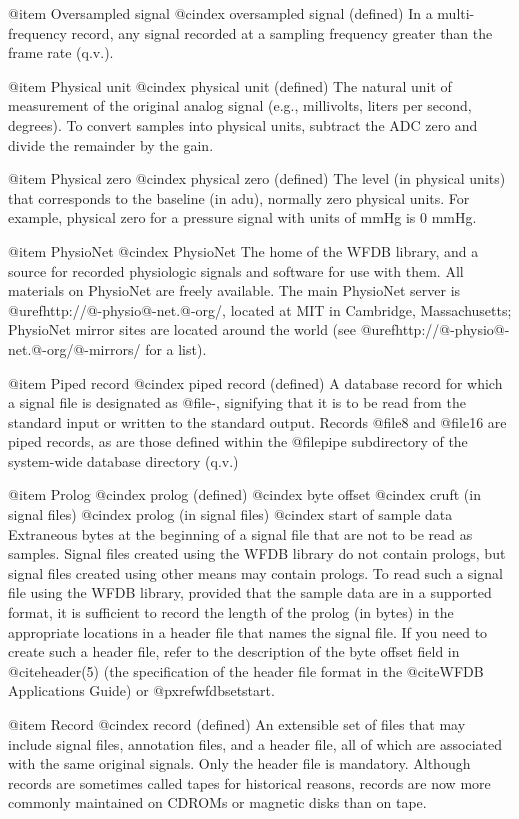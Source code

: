 {{{{{{{{@item Oversampled signal
@cindex oversampled signal (defined)
In a multi-frequency record, any signal recorded at a sampling frequency
greater than the frame rate (q.v.).

@item Physical unit
@cindex physical unit (defined)
The natural unit of measurement of the original analog signal (e.g.,
millivolts, liters per second, degrees).  To convert samples into
physical units, subtract the ADC zero and divide the remainder by the
gain.

@item Physical zero
@cindex physical zero (defined)
The level (in physical units) that corresponds to the baseline (in adu),
normally zero physical units.  For example, physical zero for a pressure
signal with units of mmHg is 0 mmHg.

@item PhysioNet
@cindex PhysioNet
The home of the WFDB library, and a source for recorded physiologic signals and
software for use with them.  All materials on PhysioNet are freely available.
The main PhysioNet server is @uref{http://@-physio@-net.@-org/}, located at
MIT in Cambridge, Massachusetts; PhysioNet mirror sites are located around the
world (see @uref{http://@-physio@-net.@-org/@-mirrors/} for a list).

@item Piped record
@cindex piped record (defined)
A database record for which a signal file is designated as @file{-},
signifying that it is to be read from the standard input or written to
the standard output.  Records @file{8} and @file{16} are piped
records, as are those defined within the @file{pipe} subdirectory of
the system-wide database directory (q.v.)

@item Prolog
@cindex prolog (defined)
@cindex byte offset
@cindex cruft (in signal files)
@cindex prolog (in signal files)
@cindex start of sample data
Extraneous bytes at the beginning of a signal file that are not to be
read as samples.  Signal files created using the WFDB library do not
contain prologs, but signal files created using other means may contain
prologs.  To read such a signal file using the WFDB library, provided that
the sample data are in a supported format, it is sufficient to record the
length of the prolog (in bytes) in the appropriate locations in a
header file that names the signal file.  If you need to create
such a header file, refer to the description of the byte offset
field in @cite{header(5)} (the specification of the header file
format in the @cite{WFDB Applications Guide}) or
@pxref{wfdbsetstart}.

@item Record
@cindex record (defined)
An extensible set of files that may include signal files, annotation
files, and a header file, all of which are associated with the
same original signals.  Only the header file is mandatory.
Although records are sometimes called tapes for historical reasons,
records are now more commonly maintained on CDROMs or magnetic disks
than on tape.

}}}}}}}}
